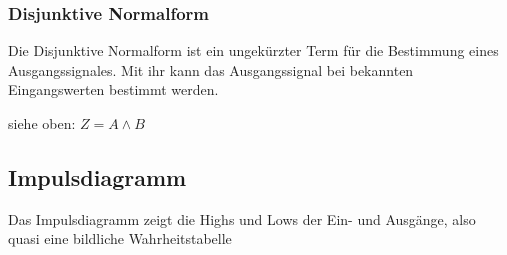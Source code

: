 \documentclass[12pt,a4paper]{article}
\begin{document}
\subsubsection{Disjunktive Normalform}
    Die Disjunktive Normalform ist ein ungekürzter Term für die Bestimmung eines Ausgangssignales. Mit ihr kann das Ausgangssignal bei bekannten Eingangswerten bestimmt werden.
\begin{center}
	siehe oben: \textcolor{green!50!olive}{$Z=A \wedge B$}
\end{center}

\subsection{Impulsdiagramm}
    Das Impulsdiagramm zeigt die Highs und Lows der Ein- und Ausgänge, also quasi eine bildliche Wahrheitstabelle
\end{document}
